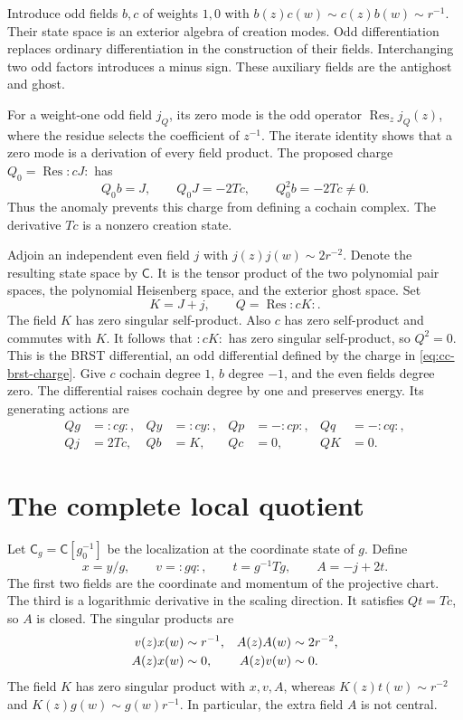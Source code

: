 Introduce odd fields $b,c$ of weights $1,0$ with
$b(z)c(w)\sim c(z)b(w)\sim r^{-1}$.
Their state space is an exterior algebra of creation modes.
Odd differentiation replaces ordinary differentiation in the construction of their fields.
Interchanging two odd factors introduces a minus sign.
These auxiliary fields are the antighost and ghost.

For a weight-one odd field $j_Q$, its zero mode is the odd operator
$\operatorname{Res}_zj_Q(z)$, where the residue selects the coefficient of $z^{-1}$.
The iterate identity shows that a zero mode is a derivation of every field product.
The proposed charge $Q_0=\operatorname{Res}:cJ:$ has
\[
 Q_0b=J,\qquad Q_0J=-2Tc,\qquad Q_0^2b=-2Tc\ne0.
\]
Thus the anomaly prevents this charge from defining a cochain complex.
The derivative $Tc$ is a nonzero creation state.

Adjoin an independent even field $j$ with $j(z)j(w)\sim2r^{-2}$.
Denote the resulting state space by $\mathsf C$.
It is the tensor product of the two polynomial pair spaces, the polynomial Heisenberg space, and the exterior ghost space.
Set
\begin{equation}\label{eq:cc-brst-charge}
 K=J+j,\qquad Q=\operatorname{Res}:cK:.
\end{equation}
The field $K$ has zero singular self-product.
Also $c$ has zero self-product and commutes with $K$.
It follows that $:cK:$ has zero singular self-product, so $Q^2=0$.
This is the BRST differential, an odd differential defined by the charge in \eqref{eq:cc-brst-charge}.
Give $c$ cochain degree $1$, $b$ degree $-1$, and the even fields degree zero.
The differential raises cochain degree by one and preserves energy.
Its generating actions are
\begin{align*}
 Qg&=:cg:,& Qy&=:cy:,& Qp&=-:cp:,& Qq&=-:cq:,\\
 Qj&=2Tc,& Qb&=K,& Qc&=0,& QK&=0.
\end{align*}

\section{The complete local quotient}

Let $\mathsf C_g=\mathsf C[g_0^{-1}]$ be the localization at the coordinate state of $g$.
Define
\begin{equation}\label{eq:cc-residual-fields}
 x=y/g,\qquad v=:gq:,\qquad t=g^{-1}Tg,\qquad A=-j+2t.
\end{equation}
The first two fields are the coordinate and momentum of the projective chart.
The third is a logarithmic derivative in the scaling direction.
It satisfies $Qt=Tc$, so $A$ is closed.
The singular products are
\begin{align}
 v(z)x(w)&\sim r^{-1},& A(z)A(w)&\sim2r^{-2},\label{eq:cc-residual-poles}\\
 A(z)x(w)&\sim0,& A(z)v(w)&\sim0.\notag
\end{align}
The field $K$ has zero singular product with $x,v,A$, whereas
$K(z)t(w)\sim r^{-2}$ and $K(z)g(w)\sim g(w)r^{-1}$.
In particular, the extra field $A$ is not central.

